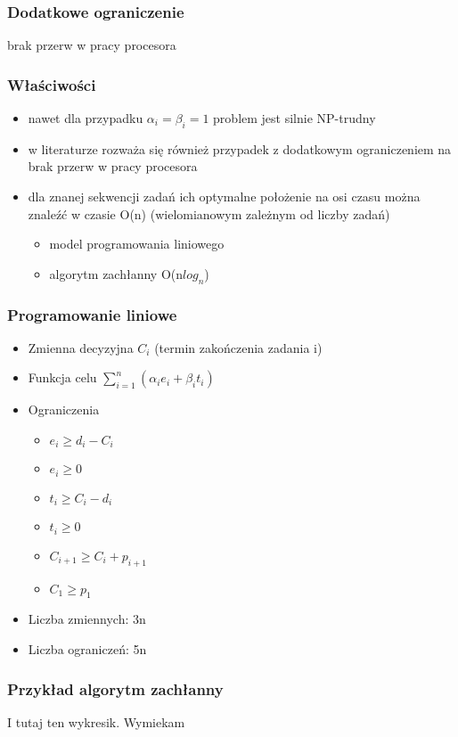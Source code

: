 \documentclass[12pt,a4paper]{article}
\begin{document}
\subsubsection{Dodatkowe ograniczenie}
brak przerw w pracy procesora
\subsubsection{Właściwości}
\begin{itemize}
\item nawet dla przypadku $\alpha_{i}=\beta_{i}=1$ problem jest silnie NP-trudny
\item w literaturze rozważa się również przypadek z dodatkowym ograniczeniem na brak przerw w pracy procesora
\item dla znanej sekwencji zadań ich optymalne położenie na osi czasu można znaleźć w czasie O(n) (wielomianowym zależnym od liczby zadań)\begin{itemize}
\item model programowania liniowego
\item algorytm zachłanny O(n$log_{n}$)
\end{itemize}
\end{itemize}
\subsubsection{Programowanie liniowe}
\begin{itemize}
\item Zmienna decyzyjna $C_{i}$ (termin zakończenia zadania i)
\item Funkcja celu $\sum\limits_{i=1}^{n}(\alpha_{i}e_{i}+\beta_{i}t_{i})$
\item Ograniczenia
 \begin{itemize}
\item $e_{i} \geq d_{i}-C_{i}$
\item $e_{i} \geq 0$
\item $t_{i} \geq C_{i}-d_{i}$
\item $t_{i} \geq 0$
\item $C_{i+1} \geq C_{i} + p_{i+1}$
\item $C_{1} \geq p_{1}$
\end{itemize}
\item Liczba zmiennych: 3n
\item Liczba ograniczeń: 5n
\end{itemize}
\subsubsection{Przykład algorytm zachłanny}
I tutaj ten wykresik. Wymiekam
\end{document}
